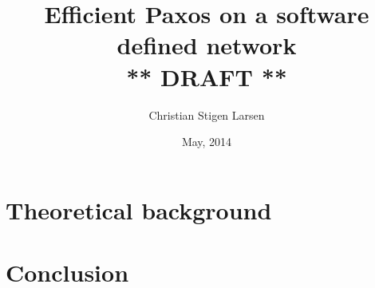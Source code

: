 \documentclass[a4paper,twosided]{book}
\begin{document}
\author{Christian Stigen Larsen}
\date{May, 2014}
\title{Efficient Paxos on a software defined network
       \\ \textsf{** DRAFT **}}

\maketitle
\tableofcontents



\chapter{Theoretical background}


\chapter{Conclusion}

\appendix




\end{document}
